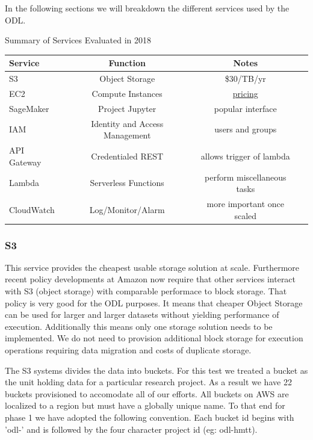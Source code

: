 In the following sections we will breakdown the different services used by the ODL.

\begin{center}
Summary of Services Evaluated in 2018
\begin{tabular}{lccr}
\hline
\hline
Service & Function & Notes \\
\hline
\hline
S3 & Object Storage & \$30/TB/yr \\
EC2 & Compute Instances & \href{https://aws.amazon.com/ec2/pricing/on-demand/}{pricing} \\
SageMaker & Project Jupyter & popular interface \\
IAM &  Identity and Access Management  & users and groups \\
API Gateway & Credentialed REST & allows trigger of lambda \\
Lambda & Serverless Functions & perform miscellaneous tasks\\
CloudWatch & Log/Monitor/Alarm & more important once scaled \\
\hline
\hline
\end{tabular}
\end{center}

\subsubsection{S3}
This service provides the cheapest usable storage solution at scale. Furthermore recent policy developments at Amazon now require that other services interact with S3 (object storage) with comparable performace to block storage. That policy is very good for the ODL purposes. It means that cheaper Object Storage can be used for larger and larger datasets without yielding performance of execution. Additionally this means only one storage solution needs to be implemented. We do not need to provision additional block storage for execution operations requiring data migration and costs of duplicate storage.

The S3 systems divides the data into buckets. For this test we treated a bucket as the unit holding data for a particular research project. As a result we have 22 buckets provisioned to accomodate all of our efforts. All buckets on AWS are localized to a region but must have a globally unique name. To that end for phase 1 we have adopted the following convention. Each bucket id begins with 'odl-' and is followed by the four character project id (eg: odl-hmtt).

